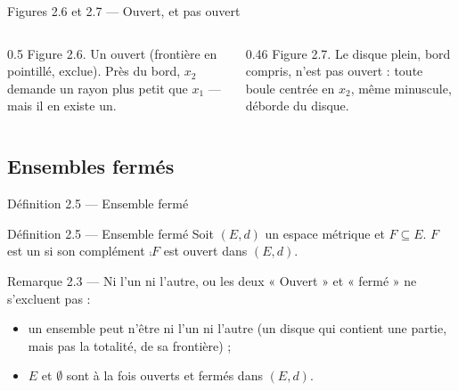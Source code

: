 \begin{frame}{Figures 2.6 et 2.7 --- Ouvert, et pas ouvert}
  \begin{columns}[T]
    \begin{column}{0.5\textwidth}
      \scriptsize Figure 2.6. Un ouvert (frontière en pointillé,
      exclue). Près du bord, $x_2$ demande un rayon plus petit que $x_1$
      --- mais il en existe un.
    \end{column}
    \begin{column}{0.46\textwidth}
      \scriptsize Figure 2.7. Le disque plein, bord compris,
      n'est pas ouvert : toute boule centrée en $x_2$, même
      minuscule, déborde du disque.
    \end{column}
  \end{columns}
\end{frame}

\subsection{Ensembles fermés}

\begin{frame}{Définition 2.5 --- Ensemble fermé}
  \begin{Enonce}{Définition 2.5 --- Ensemble fermé}
    Soit $(E,d)$ un espace métrique et $F\subseteq E$. $F$ est un
     si son complément $\comp{F}$ est ouvert dans
    $(E,d)$.
  \end{Enonce}
  \vspace{4pt}
  \begin{Rem}{Remarque 2.3 --- Ni l'un ni l'autre, ou les deux}
    « Ouvert » et « fermé » ne s'excluent pas :
    \begin{itemize}
      \item un ensemble peut n'être ni l'un ni l'autre (un disque qui
        contient une partie, mais pas la totalité, de sa frontière) ;
      \item $E$ et $\emptyset$ sont à la fois ouverts et fermés
        dans $(E,d)$.
    \end{itemize}
  \end{Rem}
\end{frame}

